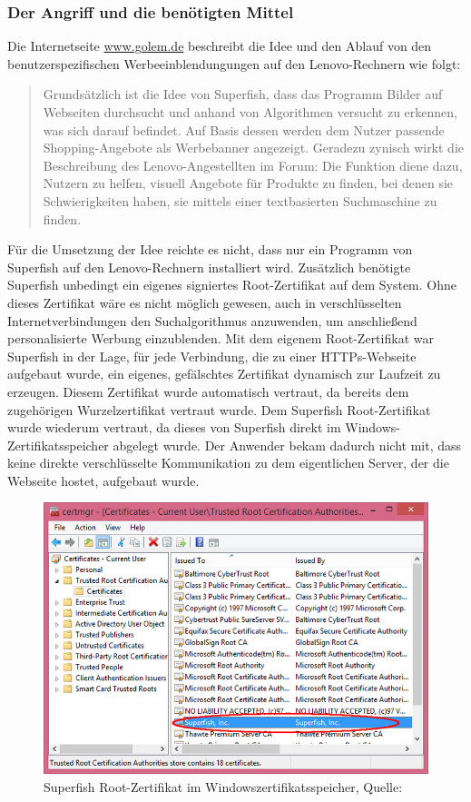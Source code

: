 \subsubsection{Der Angriff und die benötigten Mittel}
Die Internetseite \url{www.golem.de} beschreibt die Idee und den Ablauf von den benutzerspezifischen Werbeeinblendungungen auf den Lenovo-Rechnern wie folgt: 
\begin{quote}
	Grundsätzlich ist die Idee von Superfish, dass das Programm Bilder auf Webseiten durchsucht und anhand von Algorithmen versucht zu erkennen, was sich darauf befindet. Auf Basis dessen werden dem Nutzer passende Shopping-Angebote als Werbebanner angezeigt. Geradezu zynisch wirkt die Beschreibung des Lenovo-Angestellten im Forum: Die Funktion diene dazu, Nutzern zu helfen, visuell Angebote für Produkte zu finden, bei denen sie Schwierigkeiten haben, sie mittels einer textbasierten Suchmaschine zu finden.\cite{superfish}
\end{quote}
Für die Umsetzung der Idee reichte es nicht, dass nur ein Programm von Superfish auf den Lenovo-Rechnern installiert wird. Zusätzlich benötigte Superfish unbedingt ein eigenes signiertes Root-Zertifikat auf dem System. Ohne dieses Zertifikat wäre es nicht möglich gewesen, auch in verschlüsselten Internetverbindungen den Suchalgorithmus anzuwenden, um anschließend personalisierte Werbung einzublenden. Mit dem eigenem Root-Zertifikat war Superfish in der Lage, für jede Verbindung, die zu einer HTTPs-Webseite aufgebaut wurde, ein eigenes, gefälschtes Zertifikat dynamisch zur Laufzeit zu erzeugen. Diesem Zertifikat wurde automatisch vertraut, da bereits dem zugehörigen Wurzelzertifikat vertraut wurde. Dem Superfish Root-Zertifikat wurde wiederum vertraut, da dieses von Superfish direkt im Windows-Zertifikatsspeicher abgelegt wurde. Der Anwender bekam dadurch nicht mit, dass keine direkte verschlüsselte Kommunikation zu dem eigentlichen Server, der die Webseite hostet, aufgebaut wurde. 
\begin{figure}[H]
	\centering
	\includegraphics[width=.9\linewidth]{images/superfish.png}
	\caption{Superfish Root-Zertifikat im Windowszertifikatsspeicher, Quelle: \cite{superfish-bild}}
\end{figure}
